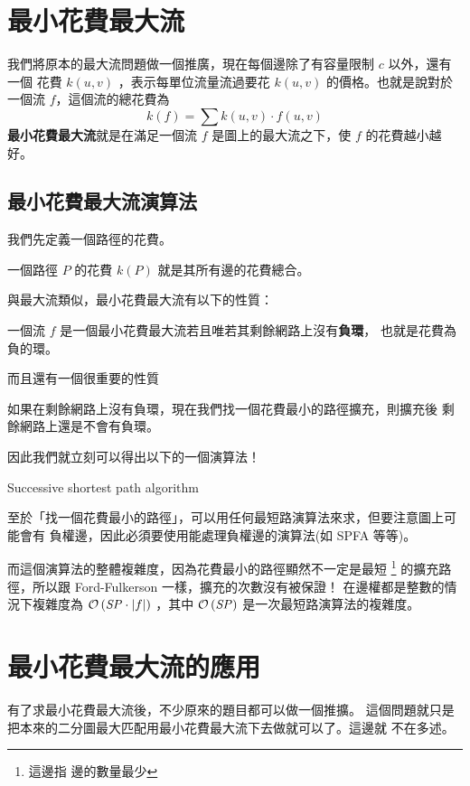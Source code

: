 \documentclass[a4paper,12pt]{book}
\begin{document}
\section{最小花費最大流}
我們將原本的最大流問題做一個推廣，現在每個邊除了有容量限制 $c$ 以外，還有一個
花費 $k(u, v)$ ，表示每單位流量流過要花 $k(u, v)$ 的價格。也就是說對於一個流
$f$，這個流的總花費為
\[ k(f) = \sum k(u, v) \cdot f(u, v) \]
{\bf 最小花費最大流}就是在滿足一個流 $f$ 是圖上的最大流之下，使 $f$ 的花費越小越好。

\subsection{最小花費最大流演算法}

我們先定義一個路徑的花費。
\begin{theorem}[定義]
  一個路徑 $P$ 的花費 $k(P)$ 就是其所有邊的花費總合。
\end{theorem}
與最大流類似，最小花費最大流有以下的性質：
\begin{theorem}[定理]
  一個流 $f$ 是一個最小花費最大流若且唯若其剩餘網路上沒有{\bf 負環}，
  也就是花費為負的環。
\end{theorem}
而且還有一個很重要的性質
\begin{theorem}[定理]
  如果在剩餘網路上沒有負環，現在我們找一個花費最小的路徑擴充，則擴充後
  剩餘網路上還是不會有負環。
\end{theorem}
因此我們就立刻可以得出以下的一個演算法！\\
\begin{algorithm}[H]
  \DontPrintSemicolon
  \caption{Successive shortest path algorithm}\label{euclid}
  \myalg{\FF{}} {
}
\end{algorithm}
至於「找一個花費最小的路徑」，可以用任何最短路演算法來求，但要注意圖上可能會有
負權邊，因此必須要使用能處理負權邊的演算法(如 SPFA 等等)。

而這個演算法的整體複雜度，因為花費最小的路徑顯然不一定是最短 \footnote{這邊指
  邊的數量最少} 的擴充路徑，所以跟 Ford-Fulkerson 一樣，擴充的次數沒有被保證！
在邊權都是整數的情況下複雜度為 $\operatorname{\mathcal{O}}\left(\mathit{SP} \cdot \lvert f \rvert\right)$ ，其中
$\operatorname{\mathcal{O}}\left(\mathit{SP}\right)$ 是一次最短路演算法的複雜度。

\section{最小花費最大流的應用}
有了求最小花費最大流後，不少原來的題目都可以做一個推擴。
這個問題就只是把本來的二分圖最大匹配用最小花費最大流下去做就可以了。這邊就
不在多述。
\end{document}
